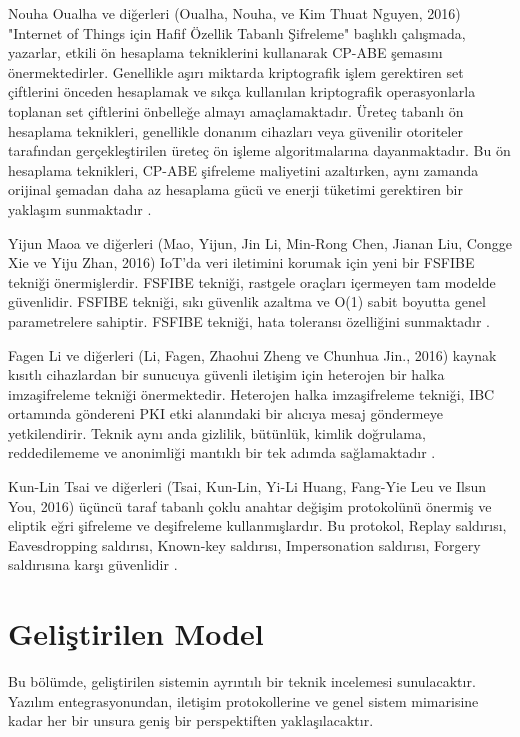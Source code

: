 \documentclass[conference, a4paper]{IEEEtran}
\begin{document}
    Nouha Oualha ve diğerleri (Oualha, Nouha, ve Kim Thuat Nguyen, 2016) "Internet of Things için Hafif Özellik Tabanlı Şifreleme" başlıklı çalışmada, yazarlar, etkili ön hesaplama tekniklerini kullanarak CP-ABE şemasını önermektedirler. Genellikle aşırı miktarda kriptografik işlem gerektiren set çiftlerini önceden hesaplamak ve sıkça kullanılan kriptografik operasyonlarla toplanan set çiftlerini önbelleğe almayı amaçlamaktadır. Üreteç tabanlı ön hesaplama teknikleri, genellikle donanım cihazları veya güvenilir otoriteler tarafından gerçekleştirilen üreteç ön işleme algoritmalarına dayanmaktadır. Bu ön hesaplama teknikleri, CP-ABE şifreleme maliyetini azaltırken, aynı zamanda orijinal şemadan daha az hesaplama gücü ve enerji tüketimi gerektiren bir yaklaşım sunmaktadır \cite{paper8}.

    Yijun Maoa  ve diğerleri (Mao, Yijun, Jin Li, Min-Rong Chen, Jianan Liu, Congge Xie ve Yiju Zhan, 2016) IoT'da veri iletimini korumak için yeni bir FSFIBE tekniği önermişlerdir. FSFIBE tekniği, rastgele oraçları içermeyen tam modelde güvenlidir. FSFIBE tekniği, sıkı güvenlik azaltma ve O(1) sabit boyutta genel parametrelere sahiptir. FSFIBE tekniği, hata toleransı özelliğini sunmaktadır \cite{paper9}.

    Fagen Li ve diğerleri (Li, Fagen, Zhaohui Zheng ve Chunhua Jin., 2016) kaynak kısıtlı cihazlardan bir sunucuya güvenli iletişim için heterojen bir halka imzaşifreleme tekniği önermektedir. Heterojen halka imzaşifreleme tekniği, IBC ortamında göndereni PKI etki alanındaki bir alıcıya mesaj göndermeye yetkilendirir. Teknik aynı anda gizlilik, bütünlük, kimlik doğrulama, reddedilememe ve anonimliği mantıklı bir tek adımda sağlamaktadır \cite{paper10}.
    
    Kun-Lin Tsai ve diğerleri (Tsai, Kun-Lin, Yi-Li Huang, Fang-Yie Leu ve Ilsun You, 2016) üçüncü taraf tabanlı çoklu anahtar değişim protokolünü önermiş ve eliptik eğri şifreleme ve deşifreleme kullanmışlardır. Bu protokol, Replay saldırısı, Eavesdropping saldırısı, Known-key saldırısı, Impersonation saldırısı, Forgery saldırısına karşı güvenlidir \cite{paper11}.
 
	\section{Geliştirilen Model}
    Bu bölümde, geliştirilen sistemin ayrıntılı bir teknik incelemesi sunulacaktır. Yazılım entegrasyonundan, iletişim protokollerine ve genel sistem mimarisine kadar her bir unsura geniş bir perspektiften yaklaşılacaktır. 
	
\end{document}
